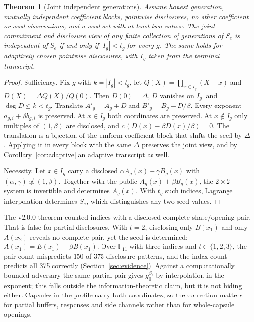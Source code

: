 \documentclass[pdflatex,sn-mathphys-num]{sn-jnl}
\theoremstyle{plain}
\newtheorem{theorem}{Theorem}
\theoremstyle{definition}
\newcommand{\F}{\mathbb{F}}
\begin{document}
\begin{keyresult}
\begin{theorem}[Joint independent generations]\label{thm:generations}
Assume honest generation, mutually independent coefficient blocks, pointwise disclosures, no other coefficient or seed observations, and a seed set with at least two values. The joint commitment and disclosure view of any finite collection of generations of $S_e$ is independent of $S_e$ if and only if $|I_g|<t_g$ for every $g$. The same holds for adaptively chosen pointwise disclosures, with $I_g$ taken from the terminal transcript.
\end{theorem}
\end{keyresult}
\begin{proof}
Sufficiency. Fix $g$ with $k=|I_g|<t_g$, let $Q(X)=\prod_{x\in I_g}(X-x)$ and $D(X)=\Delta Q(X)/Q(0)$. Then $D(0)=\Delta$, $D$ vanishes on $I_g$, and $\deg D\le k<t_g$. Translate $A'_g=A_g+D$ and $B'_g=B_g-D/\beta$. Every exponent $a_{g,i}+\beta b_{g,i}$ is preserved. At $x\in I_g$ both coordinates are preserved. At $x\notin I_g$ only multiples of $(1,\beta)$ are disclosed, and $c\,(D(x)-\beta D(x)/\beta)=0$. The translation is a bijection of the uniform coefficient block that shifts the seed by $\Delta$. Applying it in every block with the same $\Delta$ preserves the joint view, and by Corollary~\ref{cor:adaptive} an adaptive transcript as well.

Necessity. Let $x\in I_g$ carry a disclosed $\alpha A_g(x)+\gamma B_g(x)$ with $(\alpha,\gamma)\not\propto(1,\beta)$. Together with the public $A_g(x)+\beta B_g(x)$, the $2\times2$ system is invertible and determines $A_g(x)$. With $t_g$ such indices, Lagrange interpolation determines $S_e$, which distinguishes any two seed values.
\end{proof}

The v2.0.0 theorem counted indices with a disclosed complete share/opening pair. That is false for partial disclosures. With $t=2$, disclosing only $B(x_1)$ and only $A(x_2)$ reveals no complete pair, yet the seed is determined: $A(x_1)=E(x_1)-\beta B(x_1)$. Over $\F_{11}$ with three indices and $t\in\{1,2,3\}$, the pair count mispredicts 150 of 375 disclosure patterns, and the index count predicts all 375 correctly (Section~\ref{sec:evidence}). Against a computationally bounded adversary the same partial pair gives $g_0^{S_e}$ by interpolation in the exponent; this falls outside the information-theoretic claim, but it is not hiding either. Capsules in the profile carry both coordinates, so the correction matters for partial buffers, responses and side channels rather than for whole-capsule openings.
\end{document}
